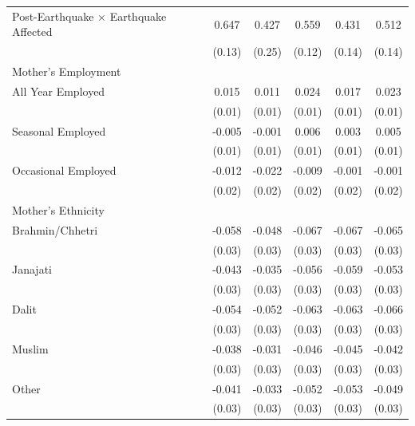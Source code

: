 \begin{longtable}{l*{5}{c}}
Post-Earthquake × Earthquake Affected                 & 0.647\sym{***} & 0.427\sym{*} & 0.559\sym{***} & 0.431\sym{***} & 0.512\sym{***} \\
                    & (0.13) & (0.25) & (0.12) & (0.14) & (0.14) \\
\multicolumn{6}{l}{Mother's Employment} \\
\hspace{1em}All Year Employed & 0.015 & 0.011 & 0.024\sym{**} & 0.017 & 0.023\sym{**} \\
                    & (0.01) & (0.01) & (0.01) & (0.01) & (0.01) \\
\hspace{1em}Seasonal Employed & -0.005 & -0.001 & 0.006 & 0.003 & 0.005 \\
                    & (0.01) & (0.01) & (0.01) & (0.01) & (0.01) \\
\hspace{1em}Occasional Employed & -0.012 & -0.022 & -0.009 & -0.001 & -0.001 \\
                    & (0.02) & (0.02) & (0.02) & (0.02) & (0.02) \\
\multicolumn{6}{l}{Mother's Ethnicity} \\
\hspace{1em}Brahmin/Chhetri & -0.058\sym{*} & -0.048 & -0.067\sym{**} & -0.067\sym{*} & -0.065\sym{*} \\
                    & (0.03) & (0.03) & (0.03) & (0.03) & (0.03) \\
\hspace{1em}Janajati & -0.043 & -0.035 & -0.056\sym{*} & -0.059\sym{*} & -0.053\sym{*} \\
                    & (0.03) & (0.03) & (0.03) & (0.03) & (0.03) \\
\hspace{1em}Dalit & -0.054\sym{*} & -0.052 & -0.063\sym{**} & -0.063\sym{**} & -0.066\sym{**} \\
                    & (0.03) & (0.03) & (0.03) & (0.03) & (0.03) \\
\hspace{1em}Muslim & -0.038 & -0.031 & -0.046\sym{*} & -0.045 & -0.042 \\
                    & (0.03) & (0.03) & (0.03) & (0.03) & (0.03) \\
\hspace{1em}Other & -0.041 & -0.033 & -0.052\sym{*} & -0.053\sym{*} & -0.049\sym{*} \\
                    & (0.03) & (0.03) & (0.03) & (0.03) & (0.03) \\

\end{longtable}
